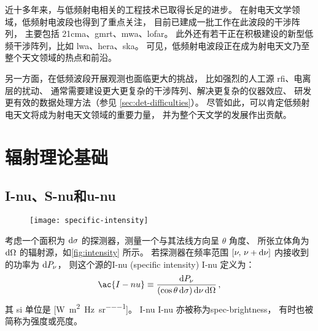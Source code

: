 近十多年来，与低频射电相关的工程技术已取得长足的进步。
在射电天文学领域，低频射电波段也得到了重点关注，
目前已建成一批工作在此波段的干涉阵列，
主要包括 \ac{21cma}、\ac{gmrt}、\ac{mwa}、\ac{lofar}。
此外还有若干正在积极建设的新型低频干涉阵列，比如 \ac{lwa}、\ac{hera}、\ac{ska}。
可见，低频射电波段正在成为射电天文乃至整个天文领域的热点和前沿。

另一方面，在低频波段开展观测也面临更大的挑战，
比如强烈的人工源 \ac{rfi}、电离层的扰动、
通常需要建设更大更复杂的干涉阵列、解决更复杂的仪器效应、
研发更有效的数据处理方法（参见 \autoref{sec:det-difficulties}）。
尽管如此，可以肯定低频射电天文将成为射电天文领域的重要力量，
并为整个天文学的发展作出贡献。


\section{辐射理论基础}
\label{sec:radiation}

\subsection{\acl*{I-nu}、\acl*{S-nu}和\acl*{u-nu}}

\begin{figure}[htp]
  \centering
  \texttt{[image: specific-intensity]}
  \label{fig:intensity}
\end{figure}

考虑一个面积为 $\mathrm{d}\sigma$ 的探测器，测量一个与其法线方向呈 $\theta$ 角度、
所张立体角为 $\mathrm{d}\Omega$ 的辐射源，如\autoref{fig:intensity} 所示。
若探测器在频率范围 $[\nu, \,\nu+\mathrm{d}\nu]$ 内接收到的功率为 $\mathrm{d}P_{\nu}$，
则这个源的\acl{I-nu} (specific intensity) \ac{I-nu} 定义为：
\begin{equation}
  \label{eq:intensity}
  \ac{I-nu} \equiv
    \frac{\D{P_{\nu}}}{(\cos\theta\,\D{\sigma}) \,\D{\nu} \,\D{\Omega}} \,,
\end{equation}
其 \ac{si} 单位是 [\si{\watt\per\square\meter\per\hertz\per\steradian}]。
\acl{I-nu} \ac{I-nu} 亦被称为\ac{spec-brightness}，
有时也被简称为强度或亮度。

